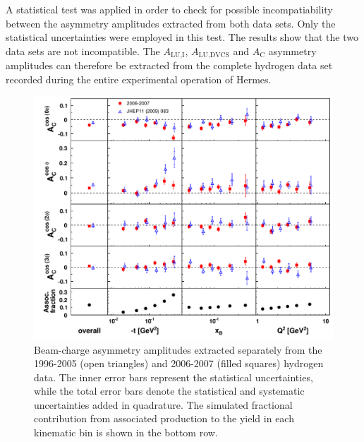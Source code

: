 A statistical test was applied in order to check for possible incompatiability between the asymmetry amplitudes extracted from both data sets. Only the statistical uncertainties were employed in this test. The results show that the two data sets are not incompatible. The $A_{\textrm{LU,I}}$, $A_{\textrm{LU,DVCS}}$ and $A_{\textrm{C}}$ asymmetry amplitudes can therefore be extracted from the complete hydrogen data set recorded during the entire experimental operation of H{\sc ermes}.
\begin{figure}
\begin{center}
 \includegraphics[width=15cm,keepaspectratio]{bcaplots_eml_par13_bin6_release_pic_update_0607_9605_withassoc}
  \caption{Beam-charge asymmetry amplitudes extracted separately from the 1996-2005 (open triangles) and 2006-2007 (filled squares) hydrogen data.
The inner error bars represent the statistical uncertainties, while the total error bars denote the statistical and systematic uncertainties added in quadrature. The simulated fractional contribution from associated production to the yield in each kinematic bin is shown in the bottom row.}
 \label{release_bca_0607}
\end{center}
 \end{figure}


